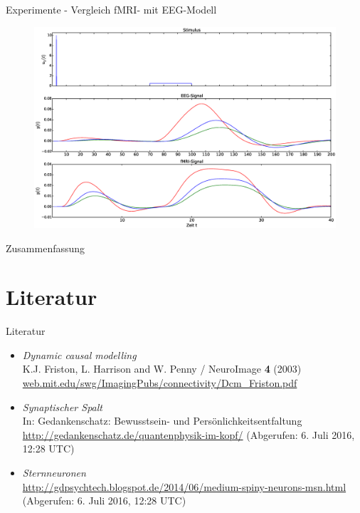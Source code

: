\documentclass{beamer}
\begin{document}
\begin{frame}{Experimente - Vergleich fMRI- mit EEG-Modell}
\begin{figure}
\centering
\includegraphics[scale=0.25]{res/hemo-EEG-vergleich3.eps}
\end{figure}
\end{frame}
 
\begin{frame}{Zusammenfassung}	
 \end{frame}

\section{Literatur}
	\begin{frame}{Literatur}
		\begin{itemize}
			\item \textit{Dynamic causal modelling} \\ {\small K.J. Friston, L. Harrison and W. Penny / NeuroImage \textbf{4} (2003)} \\ {\footnotesize \url{web.mit.edu/swg/ImagingPubs/connectivity/Dcm_Friston.pdf}}
			\item \textit{Synaptischer Spalt}\\  {\small In: Gedankenschatz: Bewusstsein- und Persönlichkeitsentfaltung}\\{\footnotesize \url{http://gedankenschatz.de/quantenphysik-im-kopf/}}  {\tiny(Abgerufen: 6. Juli 2016, 12:28 UTC)}
			\item \textit{Sternneuronen}\\{\footnotesize \url{http://gdpsychtech.blogspot.de/2014/06/medium-spiny-neurons-msn.html}}  {\tiny(Abgerufen: 6. Juli 2016, 12:28 UTC)}	
						
		\end{itemize}
	\end{frame}
	
\end{document}
